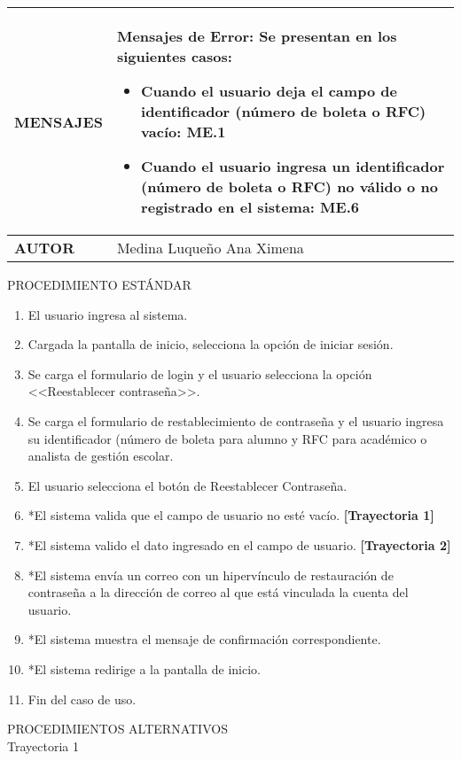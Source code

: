 \newpage
\begin{longtable}{ | p{6cm} | p{10cm} |}
\hline
\textbf{MENSAJES} & \textbf{Mensajes de Error}: Se presentan en los siguientes casos: \begin{itemize}
    \item Cuando el usuario deja el campo de identificador (número de boleta o RFC) vacío: ME.1
    \item Cuando el usuario ingresa un identificador (número de boleta o RFC) no válido o no registrado en el sistema: ME.6
\end{itemize}\\
\hline
\textbf{AUTOR} & Medina Luqueño Ana Ximena\\
\hline
\end{longtable}
\vspace*{1cm}
\noindent
\Large{PROCEDIMIENTO ESTÁNDAR}
\large{}
\begin{enumerate}
    \item El usuario ingresa al sistema.
    \item Cargada la pantalla de inicio, selecciona la opción de iniciar sesión.
    \item Se carga el formulario de login y el usuario selecciona la opción <<Reestablecer contraseña>>.
    \item Se carga el formulario de restablecimiento de contraseña y el usuario ingresa su identificador (número de boleta para alumno y RFC para académico o analista de gestión escolar.
    \item El usuario selecciona el botón de Reestablecer Contraseña.
    \item *El sistema valida que el campo de usuario no esté vacío. \textbf{[Trayectoria 1]}
    \item *El sistema valido el dato ingresado en el campo de usuario. \textbf{[Trayectoria 2]}
    \item *El sistema envía un correo con un hipervínculo de restauración de contraseña a la dirección de correo al que está vinculada la cuenta del usuario.
    \item *El sistema muestra el mensaje de confirmación correspondiente.
    \item *El sistema redirige a la pantalla de inicio.
    \item Fin del caso de uso.
\end{enumerate}
\vspace*{1cm}
\Large{PROCEDIMIENTOS ALTERNATIVOS}\\
\large{Trayectoria 1}\\
